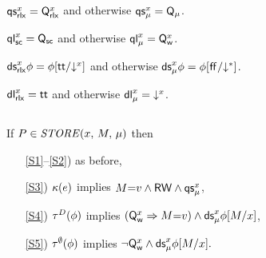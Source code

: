 $\QS{\aLoc}{\mRLX}=\Qx{\aLoc}$ and otherwise $\QS{\aLoc}{\amode}=\Q{\amode}$.

$\QL{\aLoc}{\mSC}=\Q{\mSC}$ and otherwise $\QL{\aLoc}{\amode}=\Qw{\aLoc}$.

$\DS{\aLoc}{\mRLX}{\aForm}=\aForm[\TRUE/\Dx{\aLoc}]$ and otherwise
$\DS{\aLoc}{\amode}{\aForm}=\aForm[\FALSE/\D]$. 

$\DL{\aLoc}{\mRLX}=\TRUE$ and otherwise $\DL{\aLoc}{\amode}=\Dx{\aLoc}$.

\begin{definition}$\phantom{\;}$\par
  \noindent
  If $\aPS \in \sSTORE[\amode]{\aLoc}{\aExp}$ then
  \begin{enumerate}
  \item[\ref{S1}--\ref{S2})] as before,
  \item[\ref{S3})]
    $\labelingForm(\aEv)$ implies
    \begin{math}
      \aExp{=}\aVal
      \land \RW
      \land \QS{\aLoc}{\amode}
    \end{math},
  \item[\ref{S4})]
    $\aTr[\bEvs](\aForm)$ implies 
    \begin{math}
      (\Qw{\aLoc} \limplies \aExp{=}\aVal)
      \land \DS{\aLoc}{\amode}{\aForm[\aExp/{\aLoc}]}
    \end{math},
  \item[\ref{S5})]
    $\aTr[\emptyset](\aForm)$ implies 
    \begin{math}
      \lnot\Qw{\aLoc}
      \land \DS{\aLoc}{\amode}{\aForm[\aExp/{\aLoc}]}.
    \end{math}
  \end{enumerate}


\end{definition}
